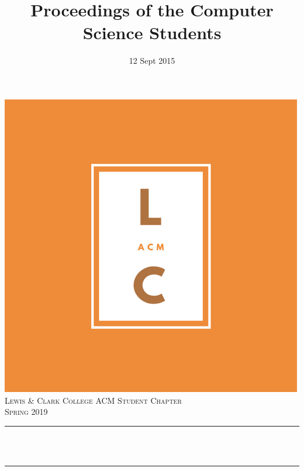 \documentclass[12pt]{article}
\title{Proceedings of the Computer Science Students}								%
\author{ }								%
\date{12 Sept 2015}											%
\makeatletter
\let\thetitle\@title
\makeatother
\begin{document}

\begin{titlepage}
	\centering
    \vspace*{0.5 cm}
    \includegraphics[scale = 0.4]{logo.png}\\[1.0 cm]	%
    \textsc{\LARGE Lewis \& Clark College ACM Student Chapter}\\[2.0 cm]	%
	\textsc{\Large Spring 2019}\\[0.5 cm]				%
	\rule{\linewidth}{0.2 mm} \\[0.4 cm]
	{ \huge \bfseries \thetitle}\\
	\rule{\linewidth}{0.2 mm} \\[1.5 cm]
	
        

\end{titlepage}
\end{document}
